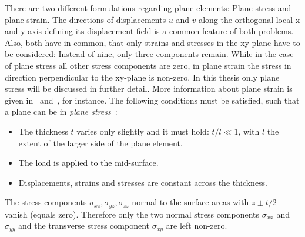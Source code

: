   There are two different formulations regarding plane elements: Plane stress and plane strain. The directions of displacements $u$ and $v$ along the orthogonal local x and y axis defining its displacement field is a common feature of both problems. Also, both have in common, that only strains and stresses in the xy-plane have to be considered: Instead of nine, only three components remain. While in the case of plane stress all other stress components are zero, in plane strain the stress in direction perpendicular to the xy-plane is non-zero. In this thesis only plane stress will be discussed in further detail. More information about plane strain is given in~\cite{zienkiewicz2000finite} and~\cite{braess2007finite}, for instance.
  The following conditions must be satisfied, such that a plane can be in \textit{plane stress}~\cite{steinke2005finite}:
  \begin{itemize}
  	\item The thickness $t$ varies only slightly and it must hold: $t/l \ll 1$, with $l$ the extent of the larger side of the plane element.
  	\item The load is applied to the mid-surface.
  	\item Displacements, strains and stresses are constant across the thickness.
  \end{itemize}
  The stress components $\sigma_{xz},\sigma_{yz},\sigma_{zz}$ normal to the surface areas with $z \pm t/2$ vanish (equals zero). Therefore only the two normal stress components $\sigma_{xx}$ and $\sigma_{yy}$ and the transverse stress component $\sigma_{xy}$ are left non-zero.
    
